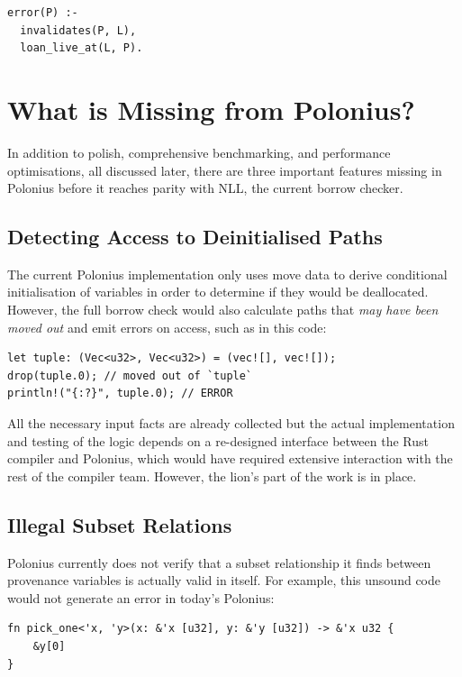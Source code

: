\documentclass[11pt,a4paper,twoside,openany]{report}
\newenvironment{sourcecode}{\captionsetup{type=listing}}{}
\begin{document}
\begin{sourcecode}
  \label{lst:error-invalidates}
\begin{verbatim}
error(P) :-
  invalidates(P, L),
  loan_live_at(L, P).
\end{verbatim}
\end{sourcecode}

\section{What is Missing from Polonius?}\label{sec:missing-features}

In addition to polish, comprehensive benchmarking, and performance
optimisations, all discussed later, there are three important features missing
in Polonius before it reaches parity with NLL, the current borrow checker.

\subsection{Detecting Access to Deinitialised Paths}
\label{sec:missing-features:move}

The current Polonius implementation only uses move data to derive conditional
initialisation of variables in order to determine if they would be deallocated.
However, the full borrow check would also calculate paths that \emph{may have
  been moved out} and emit errors on access, such as in this code:
\begin{verbatim}
let tuple: (Vec<u32>, Vec<u32>) = (vec![], vec![]);
drop(tuple.0); // moved out of `tuple`
println!("{:?}", tuple.0); // ERROR
\end{verbatim}

All the necessary input facts are already collected but the actual
implementation and testing of the logic depends on a re-designed interface
between the Rust compiler and Polonius, which would have required extensive
interaction with the rest of the compiler team. However, the lion's part of the
work is in place.

\subsection{Illegal Subset Relations}
\label{sec:missing-features:illegal-subset-relations}

Polonius currently does not verify that a subset relationship it finds between
provenance variables is actually valid in itself. For example, this unsound code
would not generate an error in today's Polonius:
\begin{verbatim}
fn pick_one<'x, 'y>(x: &'x [u32], y: &'y [u32]) -> &'x u32 {
    &y[0]
}
\end{verbatim}
\end{document}
